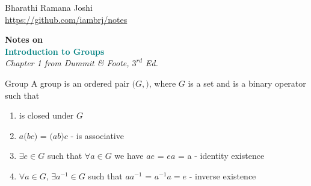 \documentclass[titlepage, 12pt]{article}
\begin{document}
\begin{titlepage} %

	\raggedleft%

	\vspace*{\baselineskip} %

	{Bharathi Ramana Joshi\\\url{https://github.com/iambrj/notes}} %

	\vspace*{0.167\textheight} %

	\textbf{\LARGE Notes on}\\[\baselineskip] %

	\textbf{\textcolor{teal}{\huge Introduction to Groups}}\\[\baselineskip] %

    {\Large \textit{Chapter 1 from Dummit \& Foote, $3^{rd}$ Ed.}} %

	\vfill %

	\vspace*{3\baselineskip} %

\end{titlepage}
\begin{definition}{Group}{}
  A group is an ordered pair $(G,$$)$, where $G$ is a set and
     is a binary operator such that

    \begin{enumerate}

      \item {} is closed under $G$

      \item $a$$(b$$c)$ = $(a$$b)$$c$
        -  is associative

      \item $\exists e\in G$ such that $\forall a\in G$ we have
        $a$$e$ = $e$$a$ = a - identity existence

      \item $\forall a\in G$, $\exists a^{-1}\in G$ such that
        $a$$a^{-1}$ = $a^{-1}$$a = e$ - inverse
        existence

    \end{enumerate}
\end{definition}
\end{document}
